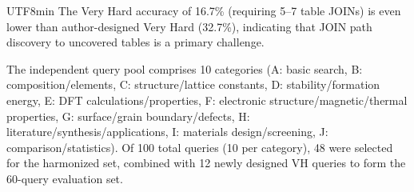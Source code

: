 \documentclass[sn-mathphys,Numbered]{sn-jnl}
\begin{document}
\begin{CJK}{UTF8}{min}
The Very Hard accuracy of 16.7\% (requiring 5--7 table JOINs)
is even lower than author-designed Very Hard (32.7\%), indicating
that JOIN path discovery to uncovered tables is a primary
challenge.

The independent query pool comprises 10 categories
(A: basic search, B: composition/elements,
C: structure/lattice constants, D: stability/formation energy,
E: DFT calculations/properties,
F: electronic structure/magnetic/thermal properties,
G: surface/grain boundary/defects,
H: literature/synthesis/applications,
I: materials design/screening, J: comparison/statistics).
Of 100 total queries (10 per category), 48 were selected for
the harmonized set, combined with 12 newly designed VH queries
to form the 60-query evaluation set.

\end{CJK}
\end{document}
